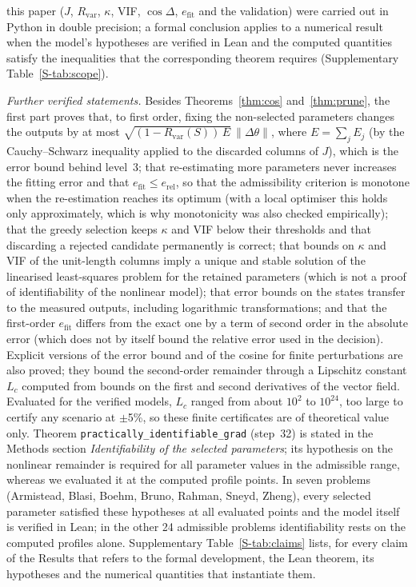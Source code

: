 \documentclass[pdflatex,sn-nature]{sn-jnl}
\theoremstyle{plain}
\begin{document}
this paper ($J$, $R_{\mathrm{var}}$, $\kappa$, VIF, $\cos\Delta$, $e_{\mathrm{fit}}$ and the validation) were carried out in Python in double precision; a formal conclusion applies to a numerical result when the model's hypotheses are verified in Lean and the computed quantities satisfy the inequalities that the corresponding theorem requires (Supplementary Table~\ref{S-tab:scope}).

\label{met:formal-further}\emph{Further verified statements.} Besides Theorems~\ref{thm:cos} and~\ref{thm:prune}, the first part proves that, to first order, fixing the non-selected parameters changes the outputs by at most $\sqrt{(1-R_{\mathrm{var}}(S))\,E}\,\|\Delta\theta\|$, where $E=\sum_j E_j$ (by the Cauchy--Schwarz inequality applied to the discarded columns of $J$), which is the error bound behind level~3; that re-estimating more parameters never increases the fitting error and that $e_{\mathrm{fit}}\le e_{\mathrm{rel}}$, so that the admissibility criterion is monotone when the re-estimation reaches its optimum (with a local optimiser this holds only approximately, which is why monotonicity was also checked empirically); that the greedy selection keeps $\kappa$ and VIF below their thresholds and that discarding a rejected candidate permanently is correct; that bounds on $\kappa$ and VIF of the unit-length columns imply a unique and stable solution of the linearised least-squares problem for the retained parameters (which is not a proof of identifiability of the nonlinear model); that error bounds on the states transfer to the measured outputs, including logarithmic transformations; and that the first-order $e_{\mathrm{fit}}$ differs from the exact one by a term of second order in the absolute error (which does not by itself bound the relative error used in the decision). Explicit versions of the error bound and of the cosine for finite perturbations are also proved; they bound the second-order remainder through a Lipschitz constant $L_c$ computed from bounds on the first and second derivatives of the vector field. Evaluated for the verified models, $L_c$ ranged from about $10^2$ to $10^{24}$, too large to certify any scenario at $\pm$5\%, so these finite certificates are of theoretical value only. Theorem \texttt{practically\_identifiable\_grad} (step~32) is stated in the Methods section \emph{Identifiability of the selected parameters}; its hypothesis on the nonlinear remainder is required for all parameter values in the admissible range, whereas we evaluated it at the computed profile points. In seven problems (Armistead, Blasi, Boehm, Bruno, Rahman, Sneyd, Zheng), every selected parameter satisfied these hypotheses at all evaluated points and the model itself is verified in Lean; in the other 24 admissible problems identifiability rests on the computed profiles alone. Supplementary Table~\ref{S-tab:claims} lists, for every claim of the Results that refers to the formal development, the Lean theorem, its hypotheses and the numerical quantities that instantiate them.
\end{document}
